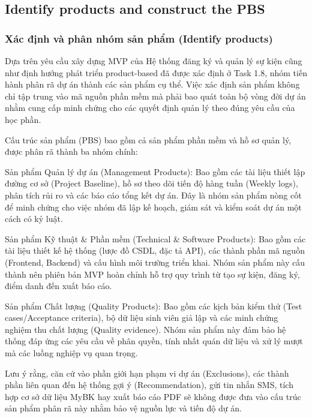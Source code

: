 \subsection{Identify products and construct the PBS}
\subsubsection{Xác định và phân nhóm sản phẩm (Identify products)}
Dựa trên yêu cầu xây dựng MVP của Hệ thống đăng ký và quản lý sự kiện cũng như định hướng phát triển product-based đã được xác định ở Task 1.8, nhóm tiến hành phân rã dự án thành các sản phẩm cụ thể. Việc xác định sản phẩm không chỉ tập trung vào mã nguồn phần mềm mà phải bao quát toàn bộ vòng đời dự án nhằm cung cấp minh chứng cho các quyết định quản lý theo đúng yêu cầu của học phần.

Cấu trúc sản phẩm (PBS) bao gồm cả sản phẩm phần mềm và hồ sơ quản lý, được phân rã thành ba nhóm chính:

Sản phẩm Quản lý dự án (Management Products): Bao gồm các tài liệu thiết lập đường cơ sở (Project Baseline), hồ sơ theo dõi tiến độ hàng tuần (Weekly logs), phân tích rủi ro và các báo cáo tổng kết dự án. Đây là nhóm sản phẩm nòng cốt để minh chứng cho việc nhóm đã lập kế hoạch, giám sát và kiểm soát dự án một cách có kỷ luật.

Sản phẩm Kỹ thuật \& Phần mềm (Technical \& Software Products): Bao gồm các tài liệu thiết kế hệ thống (lược đồ CSDL, đặc tả API), các thành phần mã nguồn (Frontend, Backend) và cấu hình môi trường triển khai. Nhóm sản phẩm này cấu thành nên phiên bản MVP hoàn chỉnh hỗ trợ quy trình từ tạo sự kiện, đăng ký, điểm danh đến xuất báo cáo.

Sản phẩm Chất lượng (Quality Products): Bao gồm các kịch bản kiểm thử (Test cases/Acceptance criteria), bộ dữ liệu sinh viên giả lập và các minh chứng nghiệm thu chất lượng (Quality evidence). Nhóm sản phẩm này đảm bảo hệ thống đáp ứng các yêu cầu về phân quyền, tính nhất quán dữ liệu và xử lý mượt mà các luồng nghiệp vụ quan trọng.

Lưu ý rằng, căn cứ vào phần giới hạn phạm vi dự án (Exclusions), các thành phần liên quan đến hệ thống gợi ý (Recommendation), gửi tin nhắn SMS, tích hợp cơ sở dữ liệu MyBK hay xuất báo cáo PDF sẽ không được đưa vào cấu trúc sản phẩm phân rã này nhằm bảo vệ nguồn lực và tiến độ dự án.

